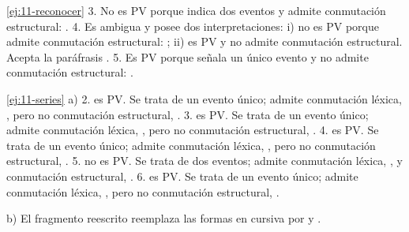 \lecturasrecomendadas

\solucionario

\begin{solucion}{\ref{ej:11-reconocer}}
3. No es PV porque indica dos eventos y admite conmutación estructural:
. 4. Es ambigua y posee
dos interpretaciones: i) no es PV porque admite conmutación estructural:
; ii) es PV y no
admite conmutación estructural. Acepta la paráfrasis . 5. Es PV porque señala un único evento y no admite
conmutación estructural: .
\end{solucion}

\begin{solucion}{\ref{ej:11-series}}
a) 2.  es PV. Se trata de un evento único; admite
conmutación léxica, , pero no conmutación estructural,
. 3.  es PV. Se trata
de un evento único; admite conmutación léxica, , pero no
conmutación estructural, . 4.
 es PV. Se trata de un evento único; admite conmutación
léxica, , pero no conmutación estructural,
. 5.  no es PV.
Se trata de dos eventos; admite conmutación léxica, , y conmutación estructural, . 6.
 es PV. Se trata de un evento único; admite conmutación
léxica, , pero no conmutación estructural,
.

b) El fragmento reescrito reemplaza las formas en cursiva por  y .
\end{solucion}

